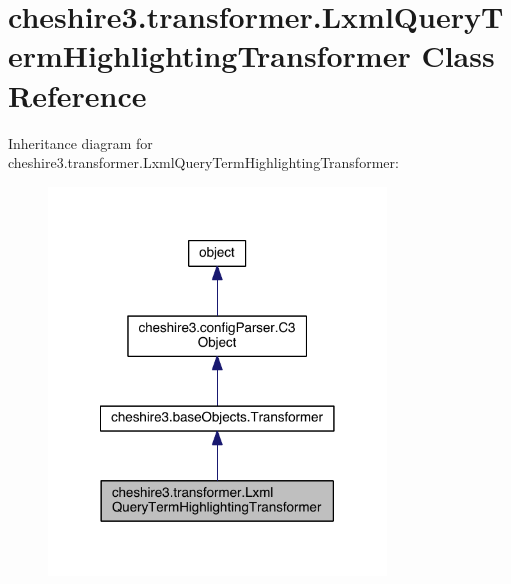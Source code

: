 \hypertarget{classcheshire3_1_1transformer_1_1_lxml_query_term_highlighting_transformer}{\section{cheshire3.\-transformer.\-Lxml\-Query\-Term\-Highlighting\-Transformer Class Reference}
\label{classcheshire3_1_1transformer_1_1_lxml_query_term_highlighting_transformer}
}


Inheritance diagram for cheshire3.\-transformer.\-Lxml\-Query\-Term\-Highlighting\-Transformer\-:
\nopagebreak
\begin{figure}[H]
\begin{center}
\leavevmode
\includegraphics[width=254pt]{classcheshire3_1_1transformer_1_1_lxml_query_term_highlighting_transformer__inherit__graph}
\end{center}
\end{figure}


